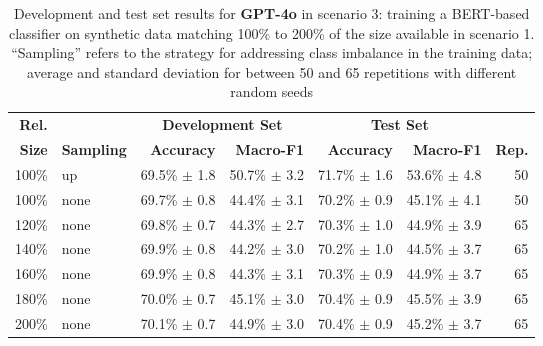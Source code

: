 
\begin{table*}[ht]
\centering
\begin{tabular}{rlrrrrr}
\textbf{Rel.}  &  &
\multicolumn{2}{c}{\textbf{Development Set}} &
\multicolumn{2}{c}{\textbf{Test Set}} \\
\textbf{Size}  & \textbf{Sampling}  &
\textbf{Accuracy} & \textbf{Macro-F1}  &
\textbf{Accuracy} & \textbf{Macro-F1}  &
\textbf{Rep.}  \\
\hline
100\%  & up  &   69.5\% $\pm$    1.8  &   50.7\% $\pm$    3.2  &   71.7\% $\pm$    1.6  &   53.6\% $\pm$    4.8  & 50  \\
\hline
100\%  & none  &   69.7\% $\pm$    0.8  &   44.4\% $\pm$    3.1  &   70.2\% $\pm$    0.9  &   45.1\% $\pm$    4.1  & 50  \\
120\%  & none  &   69.8\% $\pm$    0.7  &   44.3\% $\pm$    2.7  &   70.3\% $\pm$    1.0  &   44.9\% $\pm$    3.9  & 65  \\
140\%  & none  &   69.9\% $\pm$    0.8  &   44.2\% $\pm$    3.0  &   70.2\% $\pm$    1.0  &   44.5\% $\pm$    3.7  & 65  \\
160\%  & none  &   69.9\% $\pm$    0.8  &   44.3\% $\pm$    3.1  &   70.3\% $\pm$    0.9  &   44.9\% $\pm$    3.7  & 65  \\
180\%  & none  &   70.0\% $\pm$    0.7  &   45.1\% $\pm$    3.0  &   70.4\% $\pm$    0.9  &   45.5\% $\pm$    3.9  & 65  \\
200\%  & none  &   70.1\% $\pm$    0.7  &   44.9\% $\pm$    3.0  &   70.4\% $\pm$    0.9  &   45.2\% $\pm$    3.7  & 65  \\
\hline
\end{tabular}
\caption{Development and test set results for \textbf{GPT-4o} in scenario 3:
    training a BERT-based classifier on synthetic data matching
    100\% to 200\% of the size available in scenario 1.
    ``Sampling'' refers to the strategy for addressing class
    imbalance in the training data; average and standard deviation for between 50 and 65 repetitions with different random seeds}
\label{t:results-s4-cg12k}
\end{table*}
